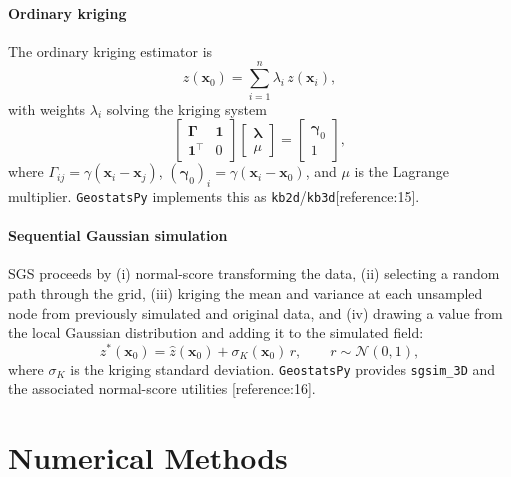 \documentclass[10pt,a4paper]{article}
\begin{document}
\subsection{Ordinary kriging}

The ordinary kriging estimator is
\begin{equation}
  \hat{z}(\bm{x}_0) = \sum_{i=1}^{n}\lambda_i\,z(\bm{x}_i),
  \label{eq:ok-est}
\end{equation}
with weights $\lambda_i$ solving the kriging system
\begin{equation}
  \begin{bmatrix}
    \bm{\Gamma} & \bm{1}\\
    \bm{1}^{\!\top} & 0
  \end{bmatrix}
  \begin{bmatrix}
    \bm{\lambda}\\ \mu
  \end{bmatrix}
  =
  \begin{bmatrix}
    \bm{\gamma}_0\\ 1
  \end{bmatrix},
  \label{eq:ok-system}
\end{equation}
where $\Gamma_{ij}=\gamma(\bm{x}_i-\bm{x}_j)$, $(\bm{\gamma}_0)_i=\gamma(\bm{x}_i-\bm{x}_0)$,
and $\mu$ is the Lagrange multiplier. \texttt{GeostatsPy} implements this as
\texttt{kb2d}/\texttt{kb3d}[reference:15].

\subsection{Sequential Gaussian simulation}

SGS proceeds by (i) normal-score transforming the data, (ii) selecting a random
path through the grid, (iii) kriging the mean and variance at each unsampled
node from previously simulated and original data, and (iv) drawing a value from
the local Gaussian distribution and adding it to the simulated field:
\begin{equation}
  z^{*}(\bm{x}_0) = \hat{z}(\bm{x}_0) + \sigma_K(\bm{x}_0)\,r,
  \qquad r\sim\mathcal{N}(0,1),
  \label{eq:sgs}
\end{equation}
where $\sigma_K$ is the kriging standard deviation. \texttt{GeostatsPy}
provides \texttt{sgsim\_3D} and the associated normal-score utilities
[reference:16].

\part{Numerical Methods}
\end{document}
